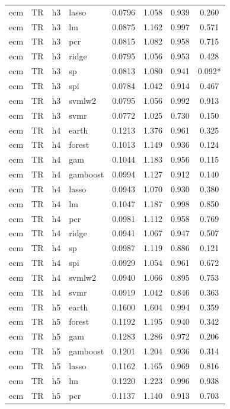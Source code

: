 \begin{ThreePartTable}
\begin{longtable}[t]{llclcccc}
ecm & TR & h3 & lasso & 0.0796 & 1.058 & 0.939 & 0.260\\
ecm & TR & h3 & lm & 0.0875 & 1.162 & 0.997 & 0.571\\
ecm & TR & h3 & pcr & 0.0815 & 1.082 & 0.958 & 0.715\\
ecm & TR & h3 & ridge & 0.0795 & 1.056 & 0.953 & 0.428\\
ecm & TR & h3 & sp & 0.0813 & 1.080 & 0.941 & 0.092*\\
ecm & TR & h3 & spi & 0.0784 & 1.042 & 0.914 & 0.467\\
ecm & TR & h3 & svmlw2 & 0.0795 & 1.056 & 0.992 & 0.913\\
ecm & TR & h3 & svmr & 0.0772 & 1.025 & 0.730 & 0.150\\
\addlinespace
ecm & TR & h4 & earth & 0.1213 & 1.376 & 0.961 & 0.325\\
ecm & TR & h4 & forest & 0.1013 & 1.149 & 0.936 & 0.124\\
ecm & TR & h4 & gam & 0.1044 & 1.183 & 0.956 & 0.115\\
ecm & TR & h4 & gamboost & 0.0994 & 1.127 & 0.912 & 0.140\\
ecm & TR & h4 & lasso & 0.0943 & 1.070 & 0.930 & 0.380\\
ecm & TR & h4 & lm & 0.1047 & 1.187 & 0.998 & 0.850\\
ecm & TR & h4 & pcr & 0.0981 & 1.112 & 0.958 & 0.769\\
ecm & TR & h4 & ridge & 0.0941 & 1.067 & 0.947 & 0.507\\
ecm & TR & h4 & sp & 0.0987 & 1.119 & 0.886 & 0.121\\
ecm & TR & h4 & spi & 0.0929 & 1.054 & 0.961 & 0.672\\
ecm & TR & h4 & svmlw2 & 0.0940 & 1.066 & 0.895 & 0.753\\
ecm & TR & h4 & svmr & 0.0919 & 1.042 & 0.846 & 0.363\\
\addlinespace
ecm & TR & h5 & earth & 0.1600 & 1.604 & 0.994 & 0.359\\
ecm & TR & h5 & forest & 0.1192 & 1.195 & 0.940 & 0.342\\
ecm & TR & h5 & gam & 0.1283 & 1.286 & 0.972 & 0.206\\
ecm & TR & h5 & gamboost & 0.1201 & 1.204 & 0.936 & 0.314\\
ecm & TR & h5 & lasso & 0.1162 & 1.165 & 0.969 & 0.816\\
ecm & TR & h5 & lm & 0.1220 & 1.223 & 0.996 & 0.938\\
ecm & TR & h5 & pcr & 0.1137 & 1.140 & 0.913 & 0.703\\

\end{longtable}
\end{ThreePartTable}

